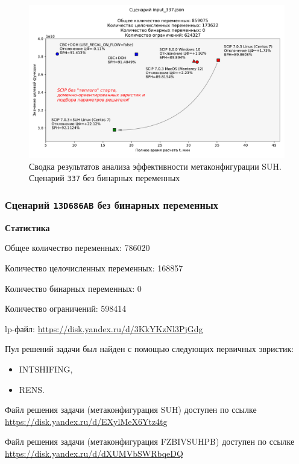 \documentclass[%
	11pt,
	a4paper,
	utf8,
		]{article}
\begin{document}
\begin{figure}[!h]
	\centering
	\includegraphics[scale=0.6]{figures/summary_337.pdf}
	\caption{Сводка результатов анализа эффективности метаконфигурации SUH. \\Сценарий \texttt{337} без бинарных переменных}\label{fig:summary_337}
\end{figure}

\subsubsection{Сценарий \texttt{13D686AB} без бинарных переменных}

\textbf{Статистика}\vspace*{1mm}

Общее количество переменных: 786020

Количество целочисленных переменных: 168857

Количество бинарных переменных: 0

Количество ограничений: 598414

lp-файл: \url{https://disk.yandex.ru/d/3KkYKzNl3PjGdg}

Пул решений задачи был найден с помощью следующих первичных эвристик:
\begin{itemize}
	\item INTSHIFING,
	
	\item RENS.
\end{itemize}

Файл решения задачи (метаконфигурация SUH) доступен по ссылке \url{https://disk.yandex.ru/d/EXylMeX6Ytz4tg}

Файл решения задачи (метаконфигурация FZBIVSUHPB) доступен по ссылке \url{https://disk.yandex.ru/d/dXUMVbSWRbqeDQ}
\end{document}
